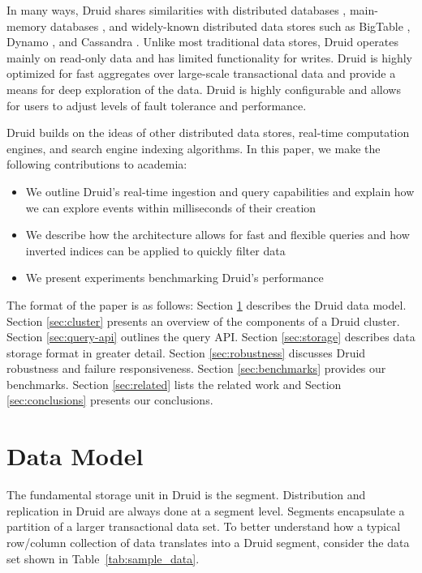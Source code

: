 \documentclass{vldb}
\begin{document}
In many ways, Druid shares similarities with distributed databases
\cite{melnik2010dremel}, main-memory databases \cite{farber2012sap}, and widely-known distributed data
stores such as BigTable \cite{chang2008bigtable}, Dynamo \cite{decandia2007dynamo}, and Cassandra \cite{lakshman2010cassandra}. Unlike
most traditional data stores, Druid operates mainly on read-only data
and has limited functionality for writes. Druid is highly optimized
for fast aggregates over large-scale transactional data and provide a
means for deep exploration of the data. Druid is highly configurable
and allows for users to adjust levels of fault tolerance and
performance.

Druid builds on the ideas of other distributed data stores, real-time
computation engines, and search engine indexing algorithms. In this
paper, we make the following contributions to academia:
\begin{itemize}
\item We outline Druid’s real-time ingestion and query capabilities
  and explain how we can explore events within milliseconds of their
  creation
\item We describe how the architecture allows for fast and flexible
  queries and how inverted indices can be applied to quickly filter
  data
\item We present experiments benchmarking Druid’s performance
\end{itemize}
The format of the paper is as follows: Section \ref{sec:data-model} describes the Druid
data model. Section \ref{sec:cluster} presents an overview of the components of a
Druid cluster. Section \ref{sec:query-api} outlines the query API. Section \ref{sec:storage} describes
data storage format in greater detail. Section \ref{sec:robustness} discusses Druid
robustness and failure responsiveness. Section \ref{sec:benchmarks} provides our
benchmarks. Section \ref{sec:related} lists the related work and Section \ref{sec:conclusions} presents
our conclusions.

\section{Data Model}
\label{sec:data-model}
The fundamental storage unit in Druid is the segment. Distribution and
replication in Druid are always done at a segment level. Segments
encapsulate a partition of a larger transactional data set. To better
understand how a typical row/column collection of data translates into
a Druid segment, consider the data set shown in Table~\ref{tab:sample_data}.
\end{document}
